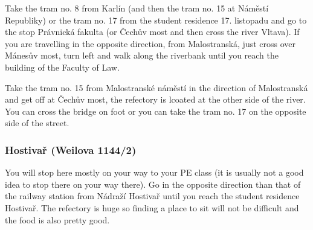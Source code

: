Take the tram no. 8 from Karlín (and then the tram no. 15 at Náměstí Republiky)
or the tram no. 17 from the student residence 17. listopadu and go to the stop
Právnická fakulta (or Čechův most and then cross the river Vltava).
If you are travelling in the opposite direction, from Malostranská, just cross
over Mánesův most, turn left and walk along the riverbank until you reach the
building of the Faculty of Law.

Take the tram no. 15 from Malostranské náměstí in the direction of Malostranská
and get off at Čechův most, the refectory is lcoated at the other side of the
river. You can cross the bridge on foot or you can take the tram no. 17 on the
opposite side of the street.


\subsubsection{Hostivař (Weilova 1144/2)}
You will stop here mostly on your way to your PE class (it is usually not a good
idea to stop there on your way there).
Go in the opposite direction than that of the railway station from Nádraží
Hostivař until you reach the student residence Hostivař. The refectory is huge
so finding a place to sit will not be difficult and the food is also pretty
good.